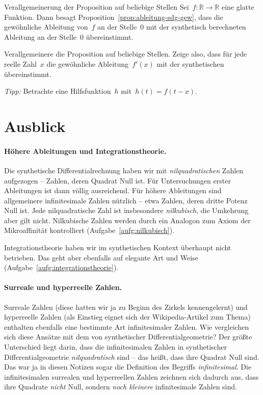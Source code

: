 \documentclass[twoside]{../zirkelblatt}
\newcommand{\RR}{\mathbb{R}}
\theoremstyle{definition}
\theoremstyle{plain}
\theoremstyle{remark}
\begin{document}
\begin{aufgabeShaded}{Verallgemeinerung der Proposition auf beliebige Stellen}
Sei~$f : \RR \to \RR$ eine glatte Funktion. Dann besagt
Proposition~\ref{prop:ableitung-sdg-gew}, dass die gewöhnliche Ableitung
von~$f$ an der Stelle~$0$ mit der synthetisch berechneten Ableitung an der
Stelle~$0$ übereinstimmt.

Verallgemeinere die Proposition auf beliebige Stellen. Zeige also, dass für
jede reelle Zahl~$x$ die gewöhnliche Ableitung~$f'(x)$ mit der synthetischen
übereinstimmt.

\emph{Tipp:} Betrachte eine Hilfsfunktion~$h$ mit~$h(t) = f(t-x)$.
\end{aufgabeShaded}


\section{Ausblick}

\paragraph{Höhere Ableitungen und Integrationstheorie.}
Die synthetische Differentialrechnung haben wir mit \emph{nilquadratischen}
Zahlen aufgezogen -- Zahlen, deren Quadrat Null ist. Für Untersuchungen erster
Ableitungen ist dann völlig ausreichend. Für höhere Ableitungen sind
allgemeinere infinitesimale Zahlen nützlich -- etwa Zahlen, deren dritte Potenz
Null ist. Jede nilquadratische Zahl ist insbesondere \emph{nilkubisch}, die
Umkehrung aber gilt nicht. Nilkubische Zahlen werden durch ein Analogon zum
Axiom der Mikroaffinität kontrolliert (Aufgabe~\ref{aufg:nilkubisch}).

Integrationstheorie haben wir im synthetischen Kontext überhaupt nicht
betrieben. Das geht aber ebenfalls auf elegante Art und Weise
(Aufgabe~\ref{aufg:integrationstheorie}).


\paragraph{Surreale und hyperreelle Zahlen.}
Surreale Zahlen (diese hatten wir ja zu Beginn des Zirkels kennengelernt)
und hyperreelle Zahlen (als Einstieg eignet sich der Wikipedia-Artikel zum
Thema) enthalten ebenfalls eine bestimmte Art infinitesimaler Zahlen. Wie
vergleichen sich diese Ansätze mit dem von synthetischer Differentialgeometrie?
Der größte Unterschied liegt darin, dass die infinitesimalen Zahlen in
synthetischer Differentialgeometrie \emph{nilquadratisch} sind -- das heißt,
dass ihre Quadrat Null sind. Das war ja in diesen Notizen sogar die Definition des
Begriffs \emph{infinitesimal}. Die infinitesimalen surrealen und hyperreellen
Zahlen zeichnen sich dadurch aus, dass ihre Quadrate \emph{nicht} Null, sondern
\emph{noch kleinere} infinitesimale Zahlen sind.
\end{document}
